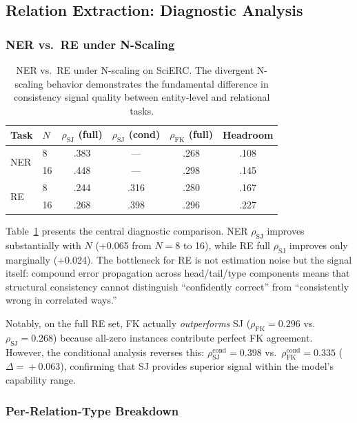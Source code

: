 \documentclass[11pt,a4paper]{article}
\newcommand{\rhosj}{\rho_{\mathrm{SJ}}}
\newcommand{\rhofk}{\rho_{\mathrm{FK}}}
\begin{document}
\subsection{Relation Extraction: Diagnostic Analysis}

\subsubsection{NER vs.\ RE under N-Scaling}

\begin{table}[t]
\centering
\caption{NER vs.\ RE under N-scaling on SciERC. The divergent N-scaling behavior demonstrates the fundamental difference in consistency signal quality between entity-level and relational tasks.}
\label{tab:ner_vs_re}
\small
\begin{tabular}{llcccc}
\toprule
\textbf{Task} & \textbf{$N$} & \textbf{$\rhosj$ (full)} & \textbf{$\rhosj$ (cond)} & \textbf{$\rhofk$ (full)} & \textbf{Headroom} \\
\midrule
\multirow{2}{*}{NER} & 8  & .383 & --- & .268 & .108 \\
                      & 16 & .448 & --- & .298 & .145 \\
\midrule
\multirow{2}{*}{RE}  & 8  & .244 & .316 & .280 & .167 \\
                      & 16 & .268 & .398 & .296 & .227 \\
\bottomrule
\end{tabular}
\end{table}

Table~\ref{tab:ner_vs_re} presents the central diagnostic comparison. NER $\rhosj$ improves substantially with $N$ (+0.065 from $N\!=\!8$ to 16), while RE full $\rhosj$ improves only marginally (+0.024). The bottleneck for RE is not estimation noise but the signal itself: compound error propagation across head/tail/type components means that structural consistency cannot distinguish ``confidently correct'' from ``consistently wrong in correlated ways.''

Notably, on the full RE set, FK actually \emph{outperforms} SJ ($\rhofk\!=\!0.296$ vs.\ $\rhosj\!=\!0.268$) because all-zero instances contribute perfect FK agreement. However, the conditional analysis reverses this: $\rhosj^{\text{cond}}\!=\!0.398$ vs.\ $\rhofk^{\text{cond}}\!=\!0.335$ ($\Delta\!=\!+0.063$), confirming that SJ provides superior signal within the model's capability range.

\subsubsection{Per-Relation-Type Breakdown}
\end{document}
